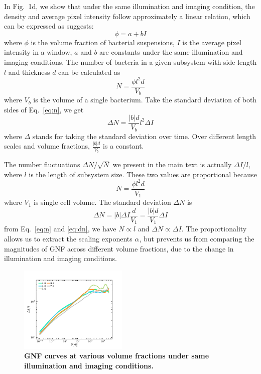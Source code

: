 \documentclass[twocolumn,aps,prx,amsmath,amssymb,longbibliography]{revtex4-2}
\begin{document}

In Fig.~1d, we show that under the same illumination and imaging condition, the density and average pixel intensity follow approximately a linear relation, which can be expressed as suggests:
\begin{equation}
  \label{eq:phi-I-relation}
  \phi = a + bI
\end{equation}
where $\phi$ is the volume fraction of bacterial suspensions, $I$ is the average pixel intensity in a window, $a$ and $b$ are constants under the same illumination and imaging conditions. The number of bacteria in a given subsystem with side length $l$ and thickness $d$ can be calculated as
\begin{equation}
  \label{eq:n}
  N = \frac{\phi l^2d}{V_b}
\end{equation}
where $V_b$ is the volume of a single bacterium. Take the standard deviation of both sides of Eq.~\ref{eq:n}, we get
\begin{equation}
  \Delta N = \frac{|b|d}{V_b} l^2\Delta I
\end{equation}
where $\Delta$ stands for taking the standard deviation over time. Over different length scales and volume fractions, $\frac{|b|d}{V_b}$ is a constant.


The number fluctuations $\Delta N/\sqrt N$ we present in the main text is actually $\Delta I/l$, where $l$ is the length of subsystem size. These two values are proportional because
\begin{equation}
\label{eq:n}
N = \frac{\phi l^2d}{V_1}
\end{equation}
where $V_1$ is single cell volume. The standard deviation $\Delta N$ is
\begin{equation}
\label{eq:dn}
\Delta N = |b|\Delta I\frac{d}{V_1} = \frac{|b|d}{V_1}\Delta I
\end{equation}
from Eq.~\ref{eq:n} and \ref{eq:dn}, we have $N \propto l$ and $\Delta N \propto \Delta I$. The proportionality allows us to extract the scaling exponents $\alpha$, but prevents us from comparing the magnitudes of GNF across different volume fractions, due to the change in illumination and imaging conditions.

\begin{figure}[t]
	\begin{center}
		\includegraphics[width=0.46\textwidth]{Figures/GNF-normalization/same-illumination.pdf}
		\caption[Density autocorrelation]
		{
			\textbf{GNF curves at various volume fractions under same illumination and imaging conditions.}
		}
		\label{fig:same-conditions}
	\end{center}
\end{figure}
\end{document}
